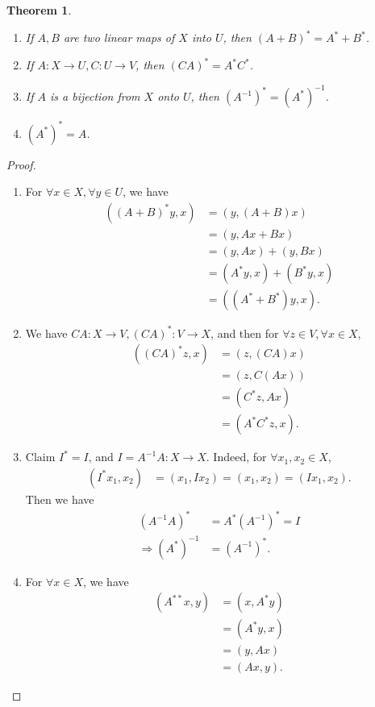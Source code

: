 \documentclass[11pt]{book}
\newtheorem{theorem}{Theorem}[section]
\theoremstyle{definition}
\numberwithin{equation}{subsection}
\begin{document}
\begin{theorem}
~\begin{enumerate}[label=(\roman*)]
    \item If $A,B$ are two linear maps of $X$ into $U$, then $(A+B)^* = A^* + B^*$.
    \item If $A:X\to U, C:U\to V$, then $(CA)^* = A^* C^*$.
    \item If $A$ is a bijection from $X$ onto $U$, then $\left(A^{-1}\right)^* = \left(A^*\right)^{-1}$.
    \item $\left(A^*\right)^* = A$.
\end{enumerate}
\end{theorem}
\begin{proof}
~\begin{enumerate}[label=(\roman*)]
    \item For $\forall x\in X, \forall y\in U$, we have
    \begin{align*}
        \left((A+B)^*y, x\right) & = (y, (A+B)x) \\
        & = (y, Ax + Bx) \\
        & = (y, Ax) + (y, Bx) \\
        & = (A^*y, x) + (B^*y, x) \\
        & = ((A^* + B^*)y, x).
    \end{align*}
    \item We have $CA:X\to V, (CA)^*:V\to X$, and then for $\forall z\in V, \forall x\in X$,
    \begin{align*}
        \left((CA)^*z, x\right) & = (z, (CA)x) \\
        & = (z, C(Ax)) \\
        & = (C^* z, Ax) \\
        & = (A^* C^* z, x).
    \end{align*}
    \item Claim $I^* = I$, and $I = A^{-1}A: X\to X$. Indeed,  for $\forall x_1, x_2\in X$,
    \begin{align*}
        (I^* x_1, x_2) & = (x_1, Ix_2) = (x_1, x_2) = (Ix_1, x_2).
    \end{align*}
    Then we have 
    \begin{align*}
        \left(A^{-1}A\right)^* & = A^* \left(A^{-1}\right)^* = I \\
        \Rightarrow \left(A^*\right)^{-1} & = \left(A^{-1}\right)^*. 
    \end{align*}
    \item For $\forall x\in X$, we have
    \begin{align*}
        \left(A^{**}x, y\right) & = (x, A^*y) \\
        & = (A^*y, x) \\
        & = (y, Ax) \\
        & = (Ax, y).
    \end{align*}
\end{enumerate}
\end{proof}
\end{document}
